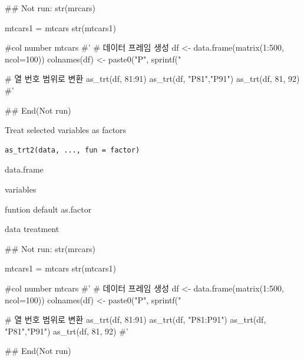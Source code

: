 \documentclass[a4paper]{book}
\begin{document}
\begin{Examples}
\begin{ExampleCode}
## Not run: 
 str(mrcars)

 mtcars1 = mtcars %
 str(mtcars1)

 #col number
 mtcars%
#'
# 데이터 프레임 생성
df <- data.frame(matrix(1:500, ncol=100))
colnames(df) <- paste0("P", sprintf("%

# 열 번호 범위로 변환
as_trt(df, 81:91)%
as_trt(df, "P81","P91")%
as_trt(df, 81, 92)%
#'



## End(Not run)

\end{ExampleCode}
\end{Examples}
%
\begin{Description}
Treat selected variables as factors
\end{Description}
%
\begin{Usage}
\begin{verbatim}
as_trt2(data, ..., fun = factor)
\end{verbatim}
\end{Usage}
%
\begin{Arguments}
\begin{ldescription}
\item[\code{data}] data.frame

\item[\code{...}] variables

\item[\code{fun}] funtion default as.factor
\end{ldescription}
\end{Arguments}
%
\begin{Value}
data treatment
\end{Value}
%
\begin{Examples}
\begin{ExampleCode}
## Not run: 
 str(mrcars)

 mtcars1 = mtcars %
 str(mtcars1)

 #col number
 mtcars%
#'
# 데이터 프레임 생성
df <- data.frame(matrix(1:500, ncol=100))
colnames(df) <- paste0("P", sprintf("%

# 열 번호 범위로 변환
as_trt(df, 81:91)%
as_trt(df, "P81:P91")%
as_trt(df, "P81","P91")%
as_trt(df, 81, 92)%
#'



## End(Not run)

\end{ExampleCode}
\end{Examples}
\end{document}
